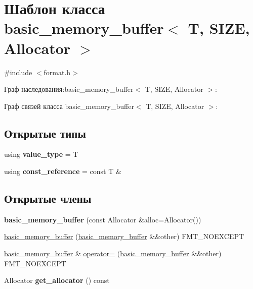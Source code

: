 \hypertarget{classbasic__memory__buffer}{}\section{Шаблон класса basic\+\_\+memory\+\_\+buffer$<$ T, S\+I\+ZE, Allocator $>$}
\label{classbasic__memory__buffer}


{\ttfamily \#include $<$format.\+h$>$}



Граф наследования\+:basic\+\_\+memory\+\_\+buffer$<$ T, S\+I\+ZE, Allocator $>$\+:


Граф связей класса basic\+\_\+memory\+\_\+buffer$<$ T, S\+I\+ZE, Allocator $>$\+:
\subsection*{Открытые типы}
\begin{DoxyCompactItemize}
\item 
\mbox{\label{classbasic__memory__buffer_aecbaa41beff571b3ff5d79a91a787524}} 
using {\bfseries value\+\_\+type} = T
\item 
\mbox{\label{classbasic__memory__buffer_a13f688782e6165086485913789b1396f}} 
using {\bfseries const\+\_\+reference} = const T \&
\end{DoxyCompactItemize}
\subsection*{Открытые члены}
\begin{DoxyCompactItemize}
\item 
\mbox{\label{classbasic__memory__buffer_af6f3373ae1ecc2104f3074fadccb3c28}} 
{\bfseries basic\+\_\+memory\+\_\+buffer} (const Allocator \&alloc=Allocator())
\item 
\hyperlink{classbasic__memory__buffer_ae3e8292ba2764ec68bb113cdc6c45b63}{basic\+\_\+memory\+\_\+buffer} (\hyperlink{classbasic__memory__buffer}{basic\+\_\+memory\+\_\+buffer} \&\&other) F\+M\+T\+\_\+\+N\+O\+E\+X\+C\+E\+PT
\item 
\hyperlink{classbasic__memory__buffer}{basic\+\_\+memory\+\_\+buffer} \& \hyperlink{classbasic__memory__buffer_a89e2e5da9bee8af9c487b4493c4d6327}{operator=} (\hyperlink{classbasic__memory__buffer}{basic\+\_\+memory\+\_\+buffer} \&\&other) F\+M\+T\+\_\+\+N\+O\+E\+X\+C\+E\+PT
\item 
\mbox{\label{classbasic__memory__buffer_aad7b7f524c4c1301f5a88e54cc68e352}} 
Allocator {\bfseries get\+\_\+allocator} () const
\end{DoxyCompactItemize}
